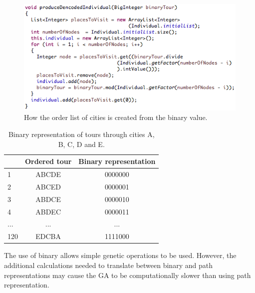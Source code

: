 \documentclass[10pt,a4paper,openbib]{article}
\begin{document}
\begin{multicols}{2}
\begin{figure}[H]
\begin{center}
\includegraphics[scale=0.5]{images/makeOrderedList.png} 
\caption{How the order list of cities is created from the binary value.}
\label{fig:toPath}
\end{center}
\end{figure}


\begin{table}[H]
\centering
\begin{tabular}{|l|c|c|}
\hline
  & \multicolumn{1}{l|}{\textbf{Ordered tour}} & \multicolumn{1}{l|}{\textbf{Binary representation}} \\ \hline
1 & ABCDE                                      & 0000000                                             \\ \hline
2 & ABCED                                      & 0000001                                             \\ \hline
3 & ABDCE                                      & 0000010                                             \\ \hline
4 & ABDEC                                      & 0000011                                             \\ \hline
... & ...                                      & ...                                             \\ \hline
120 & EDCBA                                      & 1111000                                             \\ \hline
\end{tabular}
\caption{Binary representation of tours through cities A, B, C, D and E.}
\label{table:binaryRep}
\end{table}

\noindent The use of binary allows simple genetic operations to be used. However, the additional calculations needed to translate between binary and path representations may cause the GA to be computationally slower than using path representation.  \\



\end{multicols}
\end{document}

